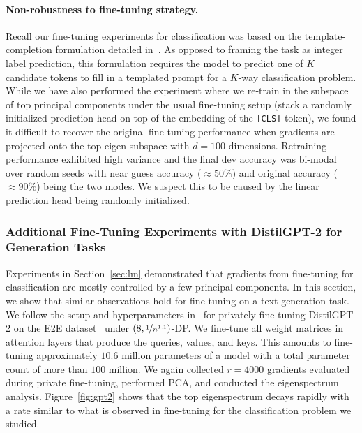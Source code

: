 \paragraph{Non-robustness to fine-tuning strategy.}
Recall our fine-tuning experiments for classification was based on the template-completion formulation detailed in~\cite{li2021large}.
As opposed to framing the task as integer label prediction, this formulation requires the model to predict one of $K$ candidate tokens to fill in a templated prompt for a $K$-way classification problem.
While we have also performed the experiment where we re-train in the subspace of top principal components under the usual fine-tuning setup (stack a randomly initialized prediction head on top of the embedding of the \texttt{[CLS]} token), we found it difficult to recover the original fine-tuning performance when gradients are projected onto the top eigen-subspace with $d=100$ dimensions. 
Retraining performance exhibited high variance and the final dev accuracy was bi-modal over random seeds with near guess accuracy ($\approx50\%$) and original accuracy ($\approx90\%$) being the two modes.
We suspect this to be caused by the linear prediction head being randomly initialized.

\subsubsection{Additional Fine-Tuning Experiments with DistilGPT-2 for Generation Tasks}
Experiments in Section~\ref{sec:lm} demonstrated that gradients from fine-tuning for classification are mostly controlled by a few principal components.
In this section, we show that similar observations hold for fine-tuning on a text generation task. 
We follow the setup and hyperparameters in~\cite{li2021large} for privately fine-tuning DistilGPT-2 on the E2E dataset~\cite{novikova2017e2e} under $(8, \nicefrac{1}{n^{1.1}})$-DP. 
We fine-tune all weight matrices in attention layers that produce the queries, values, and keys. 
This amounts to fine-tuning approximately $10.6$ million parameters of a model with a total parameter count of more than $100$ million.
We again collected $r=4000$ gradients evaluated during private fine-tuning, performed PCA, and conducted the eigenspectrum analysis.
Figure~\ref{fig:gpt2} shows that the top eigenspectrum decays rapidly with a rate similar to what is observed in fine-tuning for the classification problem we studied.

